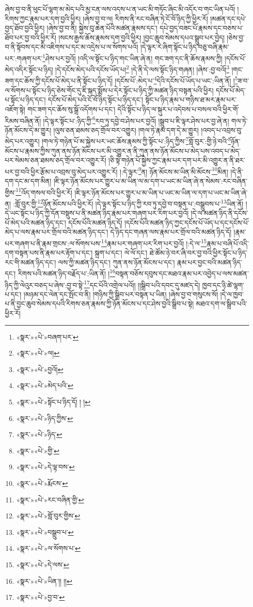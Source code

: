 ཞེས་བྱ་བ་ནི་ཕུང་པོ་ལྷག་མ་མེད་པའི་མྱ་ངན་ལས་འདས་པ་ན་ཡང་མི་གཏོང་ཞིང་མི་འདོར་བ་གང་ཡིན་པའོ། །རིགས་ཀྱང་རྣམ་པར་དག་བྱའི་ཕྱིར། །ཞེས་བྱ་བ་ལ། རིགས་ནི་རང་བཞིན་ཏེ་ངོ་བོ་ཉིད་ཀྱི་ཕྱིར་རོ། །མཚན་དང་དཔེ་བྱད་ཐོབ་བྱའི་ཕྱིར། །ཞེས་བྱ་བ་ནི། སྐྱེས་བུ་ཆེན་པོའི་མཚན་རྣམས་དང་། དཔེ་བྱད་བཟང་པོ་རྣམས་དང་བཅས་པ་ཐོབ་པར་བྱ་བའི་ཕྱིར་རོ། །སངས་རྒྱས་ཆོས་རྣམས་དག་བྱའི་ཕྱིར། །བྱང་ཆུབ་སེམས་དཔའ་སྒྲུབ་པར་བྱེད། །ཅེས་བྱ་བ་ནི་སྟོབས་དང་མི་འཇིགས་པ་དང་མ་འདྲེས་པ་ལ་སོགས་པའོ། །དེ་ལྟར་རེ་ཞིག་སྟོང་པ་ཉིད་བཅུ་བཞི་རྣམ་པར་:གཞག་པར་\footnote{«སྣར་»«པེ་»བཞག་པར་}ཤེས་པར་བྱའོ། །འདི་ལ་སྟོང་པ་ཉིད་གང་ཡིན་ཞེ་ན། གང་ཟག་དང་ནི་ཆོས་རྣམས་ཀྱི། །དངོས་པོ་མེད་འདིར་སྟོང་པ་ཉིད། །དེ་དངོས་མེད་པའི་དངོས་ཡོད་པ།\footnote{«སྣར་»«པེ་»ལ།} །དེ་ནི་དེ་ལས་སྟོང་ཉིད་གཞན། །ཞེས་:བྱ་བའོ།\footnote{«སྣར་»«པེ་»བྱའོ།} །གང་ཟག་དང་ཆོས་ཀྱི་དངོས་པོ་མེད་པ་ནི་སྟོང་པ་ཉིད་དོ། །དངོས་པོ་:མེད་པ་\footnote{«སྣར་»«པེ་»མེད་པའི་}དེའི་དངོས་པོ་ཡོད་པ་ཡང་:ཡིན་ནོ། །\footnote{«སྣར་»«པེ་»སྟོང་པ་ཉིད་དོ། ། །}ཟ་བ་ལ་སོགས་པ་སྟོང་པ་ཉིད་ཅེས་གོང་དུ་ཇི་སྐད་སྨོས་པ་དེར་སྟོང་པ་ཉིད་ཀྱི་མཚན་ཉིད་བསྟན་པའི་ཕྱིར། དངོས་པོ་མེད་པ་སྟོང་པ་ཉིད་དང་། དངོས་པོ་མེད་པའི་ངོ་བོ་ཉིད་སྟོང་པ་ཉིད་དང་། སྟོང་པ་ཉིད་རྣམ་པ་གཉིས་ཐ་མར་རྣམ་པར་འཇོག་སྟེ། གང་ཟག་དང་ཆོས་སུ་སྒྲོ་འདོགས་པ་དང་། དེའི་སྟོང་པ་ཉིད་ལ་སྐུར་པ་འདེབས་པ་བསལ་བའི་ཕྱིར་གོ་རིམས་བཞིན་ནོ། །དེ་ལྟར་སྟོང་པ་:ཉིད་ཀྱི་\footnote{«སྣར་»«པེ་»ཉིད་ཀྱིས་}རབ་ཏུ་དབྱེ་བ་ཤེས་པར་བྱའོ། །སྒྲུབ་པ་ཇི་ལྟར་ཤེས་པར་བྱ་ཞེ་ན། གལ་ཏེ་ཉོན་མོངས་དེ་མ་གྱུར། །ལུས་ཅན་ཐམས་ཅད་གྲོལ་བར་འགྱུར། །གལ་ཏེ་རྣམ་དག་དེ་མ་གྱུར། །འབད་པ་འབྲས་བུ་མེད་པར་འགྱུར། །གལ་ཏེ་གཉེན་པོ་མ་སྐྱེས་པར་ཡང་ཆོས་རྣམས་ཀྱི་སྟོང་པ་:ཉིད་ཀྱིས་\footnote{«སྣར་»«པེ་»ཉིད་}གློ་བུར་:གྱི་ཉེ་བའི་\footnote{«སྣར་»«པེ་»གྱི་}ཉོན་མོངས་པ་རྣམས་ཀྱིས་ཀུན་ནས་ཉོན་མོངས་པར་མི་འགྱུར་ན་ནི་ཀུན་ནས་ཉོན་མོངས་པ་མེད་པས་འབད་པ་མེད་པར་སེམས་ཅན་ཐམས་ཅད་གྲོལ་བར་འགྱུར་རོ། །ཅི་སྟེ་གཉེན་པོ་སྐྱེས་ཀྱང་རྣམ་པར་དག་པར་མི་འགྱུར་ན་ནི་ཐར་པར་བྱ་བའི་ཕྱིར་རྩོམ་པ་འབྲས་བུ་མེད་པར་འགྱུར་རོ། །:དེ་ལྟར་\footnote{«སྣར་»«པེ་»དེ་ལྟ་བས་}ན། ཉོན་མོངས་མ་ཡིན་མི་མོངས་\footnote{«སྣར་»«པེ་»རྨོངས་}མིན། །དེ་ནི་དག་དང་མ་དག་མིན། །ཇི་ལྟར་ཉོན་མོངས་པར་གྱུར་པ་མ་ཡིན་ལ་མ་དག་པ་ཡང་མ་ཡིན་ཞེ་ན་སེམས་:རང་བཞིན་གྱིས་\footnote{«སྣར་»«པེ་»རང་བཞིན་གྱི་}འོད་གསལ་བའི་ཕྱིར་རོ། །ཇི་ལྟར་ཉོན་མོངས་པར་གྱུར་པ་མ་ཡིན་པ་ཡང་མ་ཡིན་ལ་དག་པ་ཡང་མ་ཡིན་ཞེ་ན། :གློ་བུར་གྱི་\footnote{«སྣར་»«པེ་»གློ་བུར་གྱིས་}ཉོན་མོངས་པའི་ཕྱིར་རོ། །དེ་ལྟར་སྟོང་པ་ཉིད་ཀྱི་རབ་ཏུ་དབྱེ་བ་བསྟན་པ་:བསྒྲུབས་པ་\footnote{«སྣར་»«པེ་»བསྒྲུབ་པ་}ཡིན་ནོ། །དེ་ཡང་སྟོང་པ་ཉིད་ཀྱི་དོན་བསྡུས་པ་ནི་མཚན་ཉིད་རྣམ་པར་གཞག་པར་རིག་པར་བྱའོ། །དེ་ལ་མཚན་ཉིད་ནི་དངོས་པོ་མེད་པའི་མཚན་ཉིད་དང་། དངོས་པོའི་མཚན་ཉིད་དོ། །དངོས་པོའི་མཚན་ཉིད་ཀྱང་དངོས་པོ་ཡོད་པ་དང་དངོས་པོ་མེད་པ་ལས་རྣམ་པར་གྲོལ་བའི་མཚན་ཉིད་དང་། དེ་ཉིད་དང་གཞན་ལས་རྣམ་པར་གྲོལ་བའི་མཚན་ཉིད་དོ། །རྣམ་པར་གཞག་པ་ནི་རྣམ་གྲངས་:ལ་སོགས་པས་\footnote{«སྣར་»«པེ་»ལ་སོགས་པ་}རྣམ་པར་གཞག་པར་རིག་པར་བྱའོ། །:དེ་ལ་\footnote{«སྣར་»«པེ་»དེ་ལས་}རྣམ་པ་བཞི་པོ་འདི་དག་བསྟན་པས་ནི་རྣམ་པར་རྟོག་པ་དང་། སྐྲག་པ་དང་། ལེ་ལོ་དང་། ཐེ་ཚོམ་ཉེ་བར་ཞི་བར་བྱ་བའི་ཕྱིར་སྟོང་པ་ཉིད་རང་གི་མཚན་ཉིད་དང་། ལས་ཀྱི་མཚན་ཉིད་དང་། ཀུན་ནས་ཉོན་མོངས་པ་དང་། རྣམ་པར་བྱང་བའི་མཚན་ཉིད་དང་། རིགས་པའི་མཚན་ཉིད་བརྗོད་པ་:ཡིན་ནོ། །\footnote{«སྣར་»«པེ་»ཡིན་།། །།}བསྟན་བཅོས་དབུས་དང་མཐའ་རྣམ་པར་འབྱེད་པ་ལས་མཚན་ཉིད་ཀྱི་ལེའུར་བཅད་པ་ཞེས་:བྱ་བ་སྟེ་\footnote{«སྣར་»«པེ་»བྱ་བ་}དང་པོའི་འགྲེལ་པའོ།། །།སྒྲིབ་པའི་དབང་དུ་མཛད་དེ། ཁྱབ་དང་ཉི་ཚེ་ལྷག་པ་དང་། །མཉམ་དང་ལེན་དང་སྤོང་བ་ནི། །གཉིས་ཀྱི་སྒྲིབ་པར་བསྟན་པ་ཡིན། །ཞེས་བྱ་བ་གསུངས་སོ། །དེ་ལ་ཁྱབ་པ་ནི་བྱང་ཆུབ་སེམས་དཔའི་རིགས་ཅན་རྣམས་ཀྱི་ཉོན་མོངས་པ་དང་ཤེས་བྱའི་སྒྲིབ་པ་སྟེ། མཐའ་དག་ལ་སྒྲིབ་པའི་ཕྱིར་རོ། 